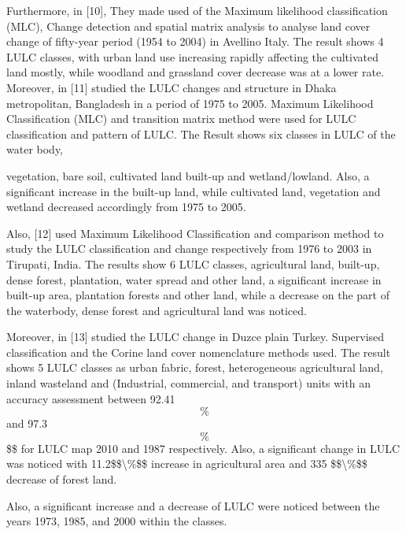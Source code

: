 \documentclass[
  letterpaper,
  DIV=11,
  numbers=noendperiod]{scrartcl}
\begin{document}
Furthermore, in {[}10{]}, They made used of the Maximum likelihood
classification (MLC), Change detection and spatial matrix analysis to
analyse land cover change of fifty-year period (1954 to 2004) in
Avellino Italy. The result shows 4 LULC classes, with urban land use
increasing rapidly affecting the cultivated land mostly, while woodland
and grassland cover decrease was at a lower rate. Moreover, in {[}11{]}
studied the LULC changes and structure in Dhaka metropolitan, Bangladesh
in a period of 1975 to 2005. Maximum Likelihood Classification (MLC) and
transition matrix method were used for LULC classification and pattern
of LULC. The Result shows six classes in LULC of the water body,

vegetation, bare soil, cultivated land built-up and wetland/lowland.
Also, a significant increase in the built-up land, while cultivated
land, vegetation and wetland decreased accordingly from 1975 to 2005.

Also, {[}12{]} used Maximum Likelihood Classification and comparison
method to study the LULC classification and change respectively from
1976 to 2003 in Tirupati, India. The results show 6 LULC classes,
agricultural land, built-up, dense forest, plantation, water spread and
other land, a significant increase in built-up area, plantation forests
and other land, while a decrease on the part of the waterbody, dense
forest and agricultural land was noticed.

Moreover, in {[}13{]} studied the LULC change in Duzce plain Turkey.
Supervised classification and the Corine land cover nomenclature methods
used. The result shows 5 LULC classes as urban fabric, forest,
heterogeneous agricultural land, inland wasteland and (Industrial,
commercial, and transport) units with an accuracy assessment between
92.41 \[\%\] and 97.3 \[\%\]\$\$ for LULC map 2010 and 1987
respectively. Also, a significant change in LULC was noticed with
11.2\$\$\textbackslash\%\$\$ increase in agricultural area and 335
\$\$\textbackslash\%\$\$ decrease of forest land.

Also, a significant increase and a decrease of LULC were noticed between
the years 1973, 1985, and 2000 within the classes.
\end{document}
